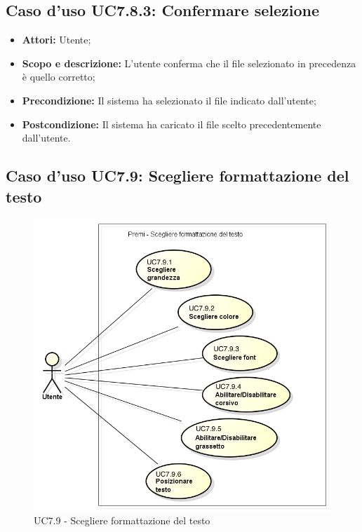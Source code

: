 \subsection{Caso d'uso UC7.8.3: Confermare selezione}
\begin{itemize}
	\item \textbf{Attori:} Utente;
	\item \textbf{Scopo e descrizione:} L'utente conferma che il file selezionato in precedenza è quello corretto;
	\item \textbf{Precondizione:} Il sistema ha selezionato il file indicato dall'utente;
	\item \textbf{Postcondizione:} Il sistema ha caricato il file scelto precedentemente dall'utente.
\end{itemize}


\subsection{Caso d'uso UC7.9: Scegliere formattazione del testo}
\begin{figure}[h] 
	\centering 
	\includegraphics[scale=0.45] {img/UC7.9.png} 
	\caption{UC7.9 - Scegliere formattazione del testo} 
\end{figure}

